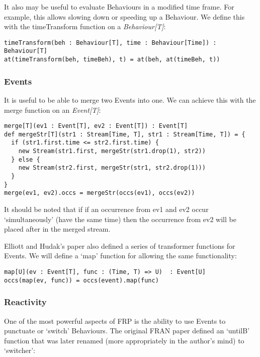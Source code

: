        It also may be useful to evaluate Behaviours in a modified time frame. For example, this allows
       slowing down or speeding up a Behaviour. We define this with the timeTransform function on a \emph{Behaviour[T]}:

\begin{verbatim}
timeTransform(beh : Behaviour[T], time : Behaviour[Time]) : Behaviour[T]
at(timeTransform(beh, timeBeh), t) = at(beh, at(timeBeh, t))
\end{verbatim}
        
      \subsubsection{Events}
        It is useful to be able to merge two Events into one. We can achieve this with the merge function on an \emph{Event[T]}:

\begin{verbatim}
merge[T](ev1 : Event[T], ev2 : Event[T]) : Event[T]
def mergeStr[T](str1 : Stream[Time, T], str1 : Stream[Time, T]) = {
  if (str1.first.time <= str2.first.time) {
    new Stream(str1.first, mergeStr(str1.drop(1), str2))
  } else {
    new Stream(str2.first, mergeStr(str1, str2.drop(1)))
  }
}
merge(ev1, ev2).occs = mergeStr(occs(ev1), occs(ev2))
\end{verbatim}            

      It should be noted that if if an occurrence from ev1 and ev2 occur `simultaneously' (have the same time) then
      the occurrence from ev2 will be placed after in the merged stream.
       
       Elliott and Hudak's paper also defined a series of transformer functions for Events. We will define a
       `map' function for allowing the same functionality:

\begin{verbatim}
map[U](ev : Event[T], func : (Time, T) => U)  : Event[U]
occs(map(ev, func)) = occs(event).map(func)
\end{verbatim}         
        
      \subsubsection{Reactivity}
        One of the most powerful aspects of FRP is the ability to use Events to punctuate or `switch' Behaviours.
        The original FRAN paper defined an `untilB' function that was later renamed (more appropriately in the
        author's mind) to `switcher':

